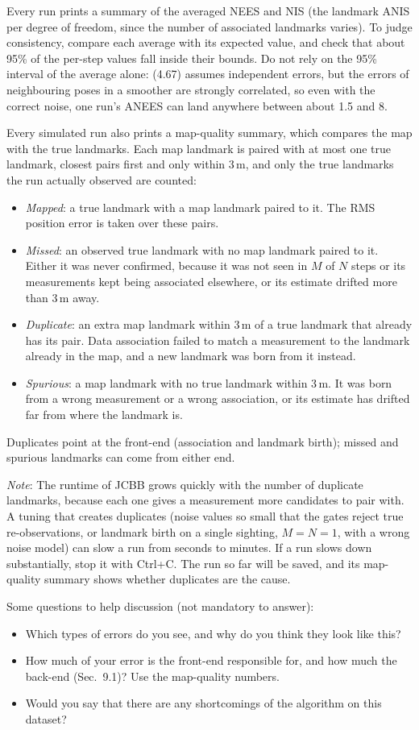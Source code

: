 Every run prints a summary of the averaged NEES and NIS (the landmark ANIS per degree of freedom, since the number of associated landmarks varies). To judge consistency, compare each average with its expected value, and check that about 95\% of the per-step values fall inside their bounds. Do not rely on the 95\% interval of the average alone: (4.67) assumes independent errors, but the errors of neighbouring poses in a smoother are strongly correlated, so even with the correct noise, one run's ANEES can land anywhere between about 1.5 and 8.

Every simulated run also prints a map-quality summary, which compares the map with the true landmarks. Each map landmark is paired with at most one true landmark, closest pairs first and only within 3\,m, and only the true landmarks the run actually observed are counted:
\begin{itemize}
    \item \emph{Mapped}: a true landmark with a map landmark paired to it. The RMS position error is taken over these pairs.
    \item \emph{Missed}: an observed true landmark with no map landmark paired to it. Either it was never confirmed, because it was not seen in \(M\) of \(N\) steps or its measurements kept being associated elsewhere, or its estimate drifted more than 3\,m away.
    \item \emph{Duplicate}: an extra map landmark within 3\,m of a true landmark that already has its pair. Data association failed to match a measurement to the landmark already in the map, and a new landmark was born from it instead.
    \item \emph{Spurious}: a map landmark with no true landmark within 3\,m. It was born from a wrong measurement or a wrong association, or its estimate has drifted far from where the landmark is.
\end{itemize}
Duplicates point at the front-end (association and landmark birth); missed and spurious landmarks can come from either end.

\textit{Note}: The runtime of JCBB grows quickly with the number of duplicate landmarks, because each one gives a measurement more candidates to pair with. A tuning that creates duplicates (noise values so small that the gates reject true re-observations, or landmark birth on a single sighting, \(M = N = 1\), with a wrong noise model) can slow a run from seconds to minutes. If a run slows down substantially, stop it with Ctrl+C. The run so far will be saved, and its map-quality summary shows whether duplicates are the cause.

\hfill

Some questions to help discussion (not mandatory to answer):
\begin{itemize}
    \item Which types of errors do you see, and why do you think they look like this?
    \item How much of your error is the front-end responsible for, and how much the back-end (Sec.\ 9.1)? Use the map-quality numbers.
    \item Would you say that there are any shortcomings of the algorithm on this dataset?
\end{itemize}
